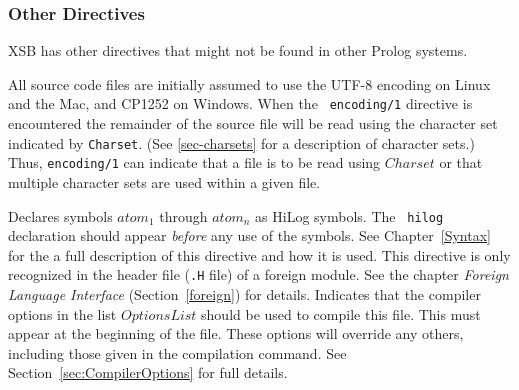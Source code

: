 
\subsubsection{Other Directives} \label{other-directives}

XSB has other directives that might not be found in other Prolog systems.

\begin{description}
%
All source code files are initially assumed to use the UTF-8 encoding
on Linux and the Mac, and CP1252 on Windows.  When the {\tt
  encoding/1} directive is encountered the remainder of the source
file will be read using the character set indicated by {\tt Charset}.
(See \ref{sec-charsets} for a description of character sets.)  Thus,
{\tt encoding/1} can indicate that a file is to be read using
$Charset$ or that multiple character sets are used within a given
file.

%
%
Declares symbols $atom_1$ through $atom_n$ as HiLog symbols.  The {\tt
  hilog} declaration should appear {\em before} any use of the
symbols.  See Chapter~\ref{Syntax} for the a full description of this
directive and how it is used.
%
%
This directive is only recognized in the header file ({\tt .H} file)
of a foreign module. See the chapter {\it Foreign Language Interface}
(Section~\ref{foreign}) for details.
%
  Indicates that the
compiler options in the list $OptionsList$ should be used to compile
this file.  This must appear at the beginning of the file.  These
options will override any others, including those given in the
compilation command.  See Section~\ref{sec:CompilerOptions} for full
details.

\end{description}

